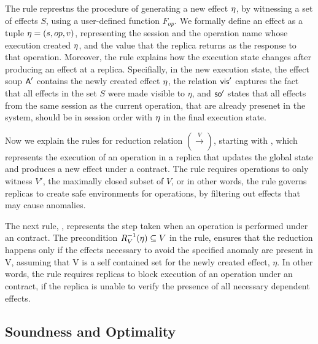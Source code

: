 The rule
 represtns the procedure of generating a new effect $\eta$, by witnessing a set
of effects $S$, using a user-defined function $F_{op}$. 
We formally define an effect as a tuple $\eta=(s,op,v)$, representing the
session and the operation name 
whose execution created $\eta$, and the value
that the replica returns as the response to that operation.
Moreover, the rule explains how the execution state changes after producing an
effect at a replica. Specifially, in the new execution state, 
the effect soup
${\normalfont \textsf{A}}'$ contains the newly created effect $\eta$, 
the relation ${\normalfont \textsf{vis}}'$
captures the fact that all effects in the set $S$ were made
visible to $\eta$, and ${\textsf{so}}'$ states that all effects from the same
session as the current operation, that are
already presenet in the system, should be in session
order with $\eta$ in the final execution state.

Now we explain the rules for reduction relation $(\xrightarrow{V})$,
starting with , which represents the execution of an
operation
in a replica that updates the global state and produces a new
effect under a \UB{} contract. 
The rule requires operations to only witness $V'$, the maximally closed
subset of $V$, or in other words, the rule governs replicas to 
create safe environments for operations, by
filtering out effects that may cause anomalies. 

The next rule, , represents the step taken when an
operation is performed under an \LB{} contract. The precondition 
$R_V^{-1}(\eta)\subseteq V$ in the rule, ensures that the reduction
happens only if the effects necessary to avoid the specified anomaly are
present in V, assuming that V is a self contained set for the newly
created effect, $\eta$. In other words, the rule requires replicas to
block execution of an operation under an \LB{} contract, if the replica is unable to verify the
presence of all necessary dependent effects.


\subsection{Soundness and Optimality}
\label{subsec:sound}


